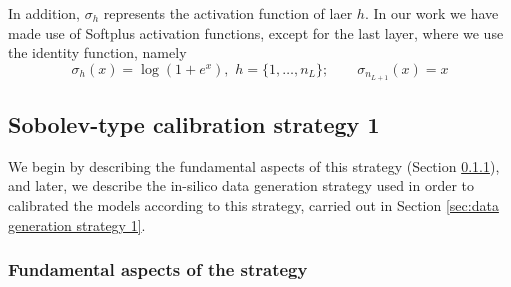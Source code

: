 In addition, $\sigma_h$ represents the activation function of laer $h$. In our work we have made use of Softplus activation functions, except for the last layer, where we use the identity function, namely
%
\begin{equation}\label{eqn:activation functions}
\sigma_h(x)=\log\left(1 + e^x\right),\,\,h=\{1,\dots,n_L\};\qquad \sigma_{n_{L+1}}(x)=x
\end{equation}

\subsection{Sobolev-type calibration strategy 1}\label{sec:strategy 1}
 
 We begin by describing the fundamental aspects of this strategy (Section \ref{sec:fundamentals strategy 1}), and later, we describe the in-silico data generation strategy used in order to calibrated the models according to this strategy, carried out in Section \ref{sec:data generation strategy 1}.

\subsubsection{Fundamental aspects of the strategy}\label{sec:fundamentals strategy 1}

